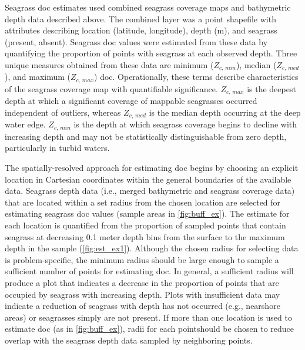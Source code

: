 \documentclass[letterpaper,12pt,oneside]{article}\usepackage[]{graphicx}\usepackage[]{color}
\begin{document}
Seagrass \acl{doc} estimates used combined seagrass coverage maps and bathymetric depth data described above.  The combined layer was a point shapefile with attributes describing location (latitude, longitude), depth (m), and seagrass (present, absent).  Seagrass \ac{doc} values were estimated from these data by quantifying the proportion of points with seagrass at each observed depth.  Three unique measures obtained from these data are minimum ($Z_{c,\,min}$), median ($Z_{c,\,med}$), and maximum ($Z_{c,\,max}$) \acl{doc}.  Operationally, these terms describe characteristics of the seagrass coverage map with quantifiable significance. $Z_{c,\,max}$ is the deepest depth at which a significant coverage of mappable seagrasses occurred independent of outliers, whereas  $Z_{c,\,med}$ is the median depth occurring at the deep water edge. $Z_{c,\,min}$ is the depth at which seagrass coverage begins to decline with increasing depth and may not be statistically distinguishable from zero depth, particularly in turbid waters.

The spatially-resolved approach for estimating \ac{doc} begins by choosing an explicit location in Cartesian coordinates within the general boundaries of the available data.  Seagrass depth data (i.e., merged bathymetric and seagrass coverage data) that are located within a set radius from the chosen location are selected for estimating seagrass \ac{doc} values (sample areas in \cref{fig:buff_ex}). The estimate for each location is quantified from the proportion of sampled points that contain seagrass at decreasing 0.1 meter depth bins from the surface to the maximum depth in the sample (\cref{fig:est_ex1}).  Although the chosen radius for selecting data is problem-specific, the minimum radius should be large enough to sample a sufficient number of points for estimating \ac{doc}.  In general, a sufficient radius will produce a plot that indicates a decrease in the proportion of points that are occupied by seagrass with increasing depth. Plots with insufficient data may indicate a reduction of seagrass with depth has not occurred (e.g.,  nearshore areas) or seagrasses simply are not present.  If more than one location is used to estimate \ac{doc} (as in \cref{fig:buff_ex}), radii for each pointshould be chosen to reduce overlap with the seagrass depth data sampled by neighboring points.     
\end{document}
